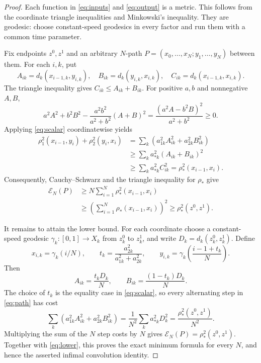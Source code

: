 \documentclass[11pt]{article}
\newcommand{\cE}{\mathcal E}
\begin{document}
\begin{proof}
Each function in \eqref{eq:inputs} and \eqref{eq:output} is a metric.  This
follows from the coordinate triangle inequalities and Minkowski's inequality.
They are geodesic: choose constant-speed geodesics in every factor and run
them with a common time parameter.

Fix endpoints \(z^0,z^1\) and an arbitrary \(N\)-path
\(P=(x_0,\ldots,x_N;y_1,\ldots,y_N)\) between them.  For each \(i,k\), put
\[
A_{ik}=d_k(x_{i-1,k},y_{i,k}),\quad
B_{ik}=d_k(y_{i,k},x_{i,k}),\quad
C_{ik}=d_k(x_{i-1,k},x_{i,k}).
\]
The triangle inequality gives \(C_{ik}\le A_{ik}+B_{ik}\).  For positive
\(a,b\) and nonnegative \(A,B\),
\begin{equation}\label{eq:scalar}
a^2A^2+b^2B^2
-\frac{a^2b^2}{a^2+b^2}(A+B)^2
=\frac{(a^2A-b^2B)^2}{a^2+b^2}\ge0.
\end{equation}
Applying \eqref{eq:scalar} coordinatewise yields
\begin{align*}
\rho_1^2(x_{i-1},y_i)+\rho_2^2(y_i,x_i)
&=\sum_k\left(a_{1k}^2A_{ik}^2+a_{2k}^2B_{ik}^2\right)\\
&\ge\sum_k a_{*k}^2(A_{ik}+B_{ik})^2\\
&\ge\sum_k a_{*k}^2C_{ik}^2
=\rho_*^2(x_{i-1},x_i).
\end{align*}
Consequently, Cauchy--Schwarz and the triangle inequality for \(\rho_*\) give
\begin{align}\label{eq:lower}
\cE_N(P)
&\ge N\sum_{i=1}^N\rho_*^2(x_{i-1},x_i)\\
&\ge\left(\sum_{i=1}^N\rho_*(x_{i-1},x_i)\right)^2
\ge\rho_*^2(z^0,z^1).\nonumber
\end{align}

It remains to attain the lower bound.  For each coordinate choose a
constant-speed geodesic \(\gamma_k:[0,1]\to X_k\) from \(z_k^0\) to
\(z_k^1\), and write \(D_k=d_k(z_k^0,z_k^1)\).  Define
\begin{equation}\label{eq:path}
x_{i,k}=\gamma_k(i/N),\qquad
t_k=\frac{a_{2k}^2}{a_{1k}^2+a_{2k}^2},\qquad
y_{i,k}=\gamma_k\left(\frac{i-1+t_k}{N}\right).
\end{equation}
Then
\[
A_{ik}=\frac{t_kD_k}{N},\qquad
B_{ik}=\frac{(1-t_k)D_k}{N}.
\]
The choice of \(t_k\) is the equality case in \eqref{eq:scalar}, so every
alternating step in \eqref{eq:path} has cost
\[
\sum_k\left(a_{1k}^2A_{ik}^2+a_{2k}^2B_{ik}^2\right)
=\frac1{N^2}\sum_k a_{*k}^2D_k^2
=\frac{\rho_*^2(z^0,z^1)}{N^2}.
\]
Multiplying the sum of the \(N\) step costs by \(N\) gives
\(\cE_N(P)=\rho_*^2(z^0,z^1)\).  Together with \eqref{eq:lower}, this proves
the exact minimum formula for every \(N\), and hence the asserted infimal
convolution identity.
\end{proof}
\end{document}
